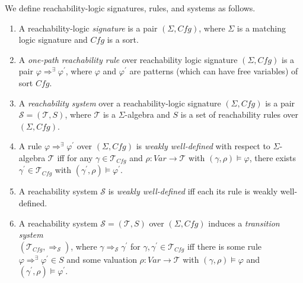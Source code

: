 \documentclass{article}
\newcommand{\Var}{\mathit{Var}}
\newcommand{\Tcfg}{\mathcal{T}_{\mathit{Cfg}}}
\begin{document}
\begin{definition}
We define reachability-logic signatures, rules, and systems as follows.
\begin{enumerate}
    \item A reachability-logic \emph{signature} is a pair $(\Sigma, \mathit{Cfg})$,
          where $\Sigma$ is a matching logic signature and $\mathit{Cfg}$ is a sort.
          
    \item A \emph{one-path reachability rule} over reachability logic signature $(\Sigma, \mathit{Cfg})$        is a pair $\varphi \Rightarrow^\exists \varphi^\prime$,
          where $\varphi$ and $\varphi^\prime$
          are patterns (which can have free variables) of sort $\mathit{Cfg}$.
          
    \item A \emph{reachability system} over a reachability-logic signature $(\Sigma, \mathit{Cfg})$
          is a pair $\mathcal{S} = (\mathcal{T}, S)$, where $\mathcal{T}$ is a $\Sigma$-algebra
          and $S$ is a set of reachability rules over $(\Sigma, \mathit{Cfg})$.
          
    \item A rule $\varphi \Rightarrow^\exists \varphi^\prime$ over $(\Sigma, \mathit{Cfg})$
          is \emph{weakly well-defined}
          with respect to $\Sigma$-algebra $\mathcal{T}$
          iff
          for any $\gamma \in \Tcfg$ and $\rho : \Var \to \mathcal{T}$
          with $(\gamma, \rho) \vDash \varphi$,
          there exists $\gamma^\prime \in \Tcfg$ with $(\gamma^\prime , \rho) \vDash \varphi^\prime$.
          
    \item A reachability system $\mathcal{S}$ is \emph{weakly well-defined} iff each its rule is weakly     
          well-defined.
          
    \item A reachability system $\mathcal{S} = (\mathcal{T}, S)$ over $(\Sigma, \mathit{Cfg})$ induces
          a \emph{transition system} \\
          $(\Tcfg , \Rightarrow_{\mathcal{S}})$,
          where $\gamma \Rightarrow_{\mathcal{S}} \gamma^\prime$
          for $\gamma, \gamma^\prime \in \Tcfg$
          iff there is some rule \\ $\varphi \Rightarrow^\exists \varphi^\prime \in S$
          and some valuation $\rho : \Var \to \mathcal{T}$ with $(\gamma, \rho) \vDash \varphi$
          and $(\gamma^\prime , \rho) \vDash \varphi^\prime$.


\end{enumerate}
\end{definition}
\end{document}
